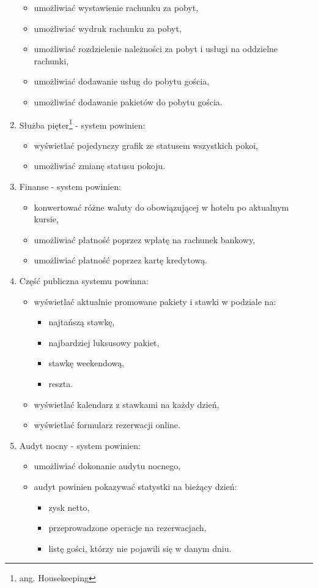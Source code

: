 \documentclass[a4paper,onecolumn,oneside,11pt,wide,floatssmall]{mwrep}
\theoremstyle{definition}
\theoremstyle{plain}%
\theoremstyle{remark}
\begin{document}
\begin{enumerate}
\begin{itemize}
      \item umożliwiać wystawienie rachunku za pobyt,
      \item umożliwiać wydruk rachunku za pobyt,
      \item umożliwiać rozdzielenie należności za pobyt i usługi na oddzielne rachunki,
      \item umożliwiać dodawanie usług do pobytu gościa,
      \item umożliwiać dodawanie pakietów do pobytu gościa.
    \end{itemize}
  \item Służba pięter\footnote{ang. Housekeeping} - system powinien:
    \begin{itemize}
      \item wyświetlać pojedynczy grafik ze statusem wszystkich pokoi,
      \item umożliwiać zmianę statusu pokoju.
    \end{itemize}
  \item Finanse - system powinien:
    \begin{itemize}
      \item konwertować różne waluty do obowiązującej w hotelu po aktualnym kursie,
      \item umożliwiać płatność poprzez wpłatę na rachunek bankowy,
      \item umożliwiać płatność poprzez kartę kredytową.
    \end{itemize}
  \item Część publiczna systemu powinna:
    \begin{itemize}
      \item wyświetlać aktualnie promowane pakiety i stawki w podziale na:
        \begin{itemize}
          \item najtańszą stawkę,
          \item najbardziej luksusowy pakiet,
          \item stawkę weekendową,
          \item reszta.
        \end{itemize}
      \item wyświetlać kalendarz z stawkami na każdy dzień,
      \item wyświetlać formularz rezerwacji online.
    \end{itemize}
  \item Audyt nocny - system powinien:
    \begin{itemize}
      \item umożliwiać dokonanie audytu nocnego,
      \item audyt powinien pokazywać statystki na bieżący dzień:
        \begin{itemize}
          \item zysk netto,
          \item przeprowadzone operacje na rezerwacjach,
          \item listę gości, którzy nie pojawili się w danym dniu.
        \end{itemize}
    \end{itemize}
\end{enumerate}
\end{document}
